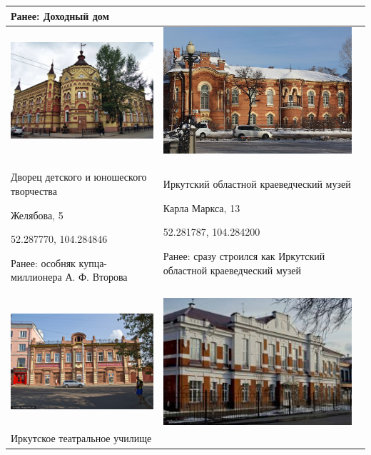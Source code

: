 \begin{supertabular}[c]{@{}|p{8cm}|p{8cm}|@{}}
    Ранее: Доходный дом \\
    \hline
    \includegraphics[width=7cm]{8} & \includegraphics[width=7cm]{9} \\
    \hline
    Дворец детского и юношеского творчества 
    
    Желябова, 5 

    52.287770, 104.284846

    Ранее: особняк купца-миллионера А. Ф. Второва & Иркутский областной краеведческий музей 

    Карла Маркса, 13 
    
    52.281787, 104.284200 
    
    Ранее: сразу строился как Иркутский областной краеведческий музей \\
    \hline
    \includegraphics[width=7cm]{10} & \includegraphics[width=7cm]{11} \\
    \hline
    Иркутское театральное училище
    

\end{supertabular}
